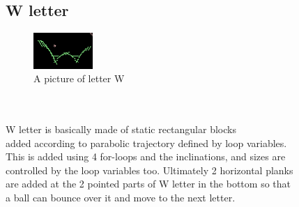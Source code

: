 \subsection{W letter}
\begin{figure}
	\caption{A picture of letter W}
	\centering
	 \includegraphics[width=0.2\textwidth]{./doc/W.png}%
\end{figure}
\begin{frame}
\centering
\\
\\
W letter is basically made of static rectangular blocks \\added according to parabolic trajectory defined by loop variables.\\ This is added
using 4 for-loops and the inclinations, and sizes are \\controlled by the loop variables too. Ultimately 2 horizontal planks\\ are added
at the 2 pointed parts of W letter in the bottom so that \\a ball can bounce over it and move to the next letter.
\end{frame}
\\
\\
\\

